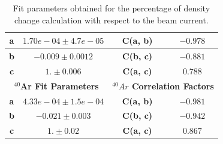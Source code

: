 \documentclass[final,5p,times,twocolumn,balance]{elsarticle}
\begin{document}
\begin{table}[!h]
\begin{tabular}{|c|c|l|c|c|l|}
\textbf{a}              & \multicolumn{2}{c|}{$1.70e-04 \pm 4.7e-05$}                & \textbf{C(a, b)}             & \multicolumn{2}{c|}{$-0.978$} \\ \hline
\textbf{b}              & \multicolumn{2}{c|}{$-0.009 \pm 0.0012$}                   & \textbf{C(b, c)}             & \multicolumn{2}{c|}{$-0.881$} \\ \hline
\textbf{c}              & \multicolumn{2}{c|}{$1. \pm 0.006$}                        & \textbf{C(a, c)}             & \multicolumn{2}{c|}{$0.788$}  \\ \hline
\multicolumn{3}{|c|}{\textbf{$^{40}$Ar Fit Parameters}}                              & \multicolumn{3}{c|}{\textbf{$^{40}Ar$ Correlation Factors}}  \\ \hline
\textbf{a}              & \multicolumn{2}{c|}{$4.33 e-04 \pm 1.5e-04$}               & \textbf{C(a, b)}             & \multicolumn{2}{c|}{$-0.981$} \\ \hline
\textbf{b}              & \multicolumn{2}{c|}{$-0.021 \pm 0.003$}                    & \textbf{C(b, c)}             & \multicolumn{2}{c|}{$-0.942$} \\ \hline
\textbf{c}              & \multicolumn{2}{c|}{$1. \pm 0.02$}                         & \textbf{C(a, c)}             & \multicolumn{2}{c|}{$0.867$}  \\ \hline
\end{tabular}
\caption{Fit parameters obtained for the percentage of density change calculation with respect to the beam current.}
\label{tab:fit_parameters}
\end{table}
\end{document}
